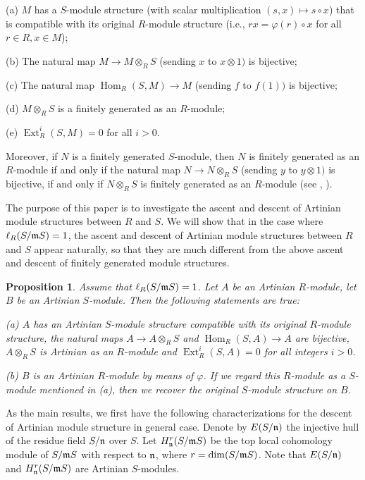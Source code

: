 \documentclass[a4papersize]{article}
\newtheorem{proposition}[theorem]{Proposition}
\DeclareMathOperator{\Hom}{Hom}
\DeclareMathOperator{\Ext}{Ext}
\begin{document}
(a) $M$ has a $S$-module structure (with scalar multiplication $(s,x)\mapsto s\circ x$) that is compatible with its original $R$-module structure (i.e., $rx=\varphi(r)\circ x$ for all $r\in R, x\in M$);

(b) The natural map $M\to M\otimes_R S$ (sending $x$ to $x\otimes 1)$ is bijective;

(c) The natural map $\Hom_R(S, M)\to M$ (sending $f$ to $f(1))$ is bijective;

(d) $M\otimes_R S$ is a finitely generated as an $R$-module;

(e) $\Ext^i_R(S, M)=0$ for all $i>0.$

\noindent Moreover, if $N$ is a  finitely generated $S$-module, then $N$ is finitely generated as an $R$-module if and only if the natural map $N\to N\otimes_R S$ (sending $y$ to $y\otimes 1)$ is bijective, if and only if $N\otimes_R S$ is finitely generated as an $R$-module (see \cite{AW}, \cite{FWW}).

The purpose  of this paper is to investigate the ascent and descent of Artinian module structures between $R$ and $S$. We will show that in the case where  $\ell_R(S/\frak mS)=1$, the ascent and descent of Artinian module structures between $R$ and $S$ appear naturally, so that they are much different from the above ascent and descent of finitely generated module structures. 

\begin{proposition} Assume that $\ell_R(S/\frak mS)=1$. Let $A$ be an Artinian $R$-module, let $B$ be an Artinian $S$-module. Then the following statements are  true:

(a) $A$ has an Artinian $S$-module structure compatible with its original $R$-module structure, the natural maps $A\rightarrow A\otimes_R S$ and $\Hom_R(S, A)\rightarrow A$ are bijective, $A\otimes_R S$ is Artinian as an $R$-module  and $\Ext^i_R(S, A)=0$ for all integers $i>0$.  

(b) $B$ is an Artinian $R$-module by means of $\varphi$.  If we regard this $R$-module as a $S$-module mentioned in (a), then  we recover the original $S$-module structure on $B$.
\end{proposition}


As the main results, we first have the following characterizations for the descent of Artinian module structure in general case. Denote by $E(S/\frak n)$ the injective hull of the residue field $S/\frak n$ over $S$. Let $H^r_{\frak n}(S/\frak mS)$ be the top local cohomology module of $S/\frak mS$ with respect to $\frak n$, where $r=\dim(S/\frak mS)$. Note that $E(S/\frak n)$ and $H^r_{\frak n}(S/\frak mS)$ are Artinian $S$-modules. 
\end{document}
